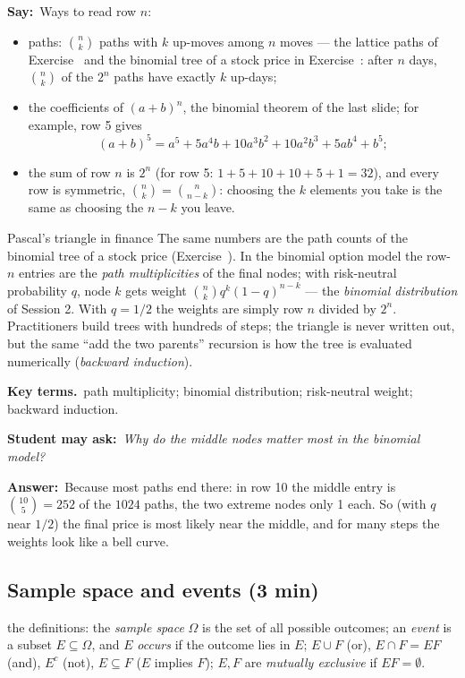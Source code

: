 \documentclass[11pt,a4paper,parskip=half]{scrartcl}
\newcommand{\Om}{\Omega}
\newcommand{\terms}{\par\textbf{\color{plum}Key terms.}\ }
\newcommand{\sq}[1]{\par\textbf{\color{plum}Student may ask:}\ \emph{#1}\par}
\newcommand{\ans}{\textbf{Answer:}\ }
\newcommand{\say}{\textbf{\color{teal}Say:}\ }
\begin{document}
\say Ways to read row $n$:
\begin{itemize}
	\item paths: $\binom nk$ paths with $k$ up-moves among $n$ moves --- the
	      lattice paths of Exercise~ and the binomial
	      tree of a stock price in Exercise~: after $n$
	      days, $\binom nk$ of the $2^n$ paths have exactly $k$ up-days;
	\item the coefficients of $(a+b)^n$, the binomial theorem of the last
	      slide; for example, row 5 gives
	      \[ (a+b)^5=a^5+5a^4b+10a^3b^2+10a^2b^3+5ab^4+b^5; \]
	\item the sum of row $n$ is $2^n$ (for row 5: $1+5+10+10+5+1=32$), and
	      every row is symmetric, $\binom nk=\binom n{n-k}$: choosing the $k$
	      elements you take is the same as choosing the $n-k$ you leave.
\end{itemize}

\begin{bg}{Pascal's triangle in finance}
	The same numbers are the path counts of the binomial tree of a stock
	price (Exercise~). In the binomial option model the
	row-$n$ entries are the \emph{path multiplicities} of the final nodes;
	with risk-neutral probability $q$, node $k$ gets weight
	$\binom nk q^k(1-q)^{n-k}$ --- the \emph{binomial distribution} of
	Session 2. With $q=1/2$ the weights are simply row $n$ divided by $2^n$.
	Practitioners build trees with hundreds of steps; the triangle is never
	written out, but the same ``add the two parents'' recursion is how the
	tree is evaluated numerically (\emph{backward induction}).

	\terms path multiplicity; binomial distribution; risk-neutral weight;
	backward induction.

	\sq{Why do the middle nodes matter most in the binomial model?}
	\ans Because most paths end there: in row 10 the middle entry is
	$\binom{10}{5}=252$ of the $1024$ paths, the two extreme nodes only 1
	each. So (with $q$ near $1/2$) the final price is most likely near the
	middle, and for many steps the weights look like a bell curve.
\end{bg}

\needspace{0.35\textheight}
\subsection{Sample space and events (3 min)}

\begin{onslide}
	the definitions: the \emph{sample space} $\Om$ is the set of all
	possible outcomes; an \emph{event} is a subset $E\subseteq\Om$, and $E$
	\emph{occurs} if the outcome lies in $E$; $E\cup F$ (or), $E\cap F=EF$
	(and), $E^c$ (not), $E\subseteq F$ ($E$ implies $F$); $E,F$ are
	\emph{mutually exclusive} if $EF=\emptyset$.
\end{onslide}
\end{document}
